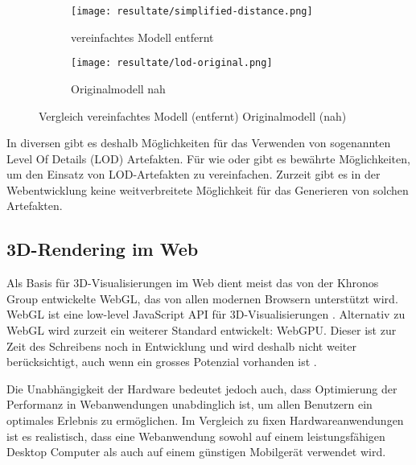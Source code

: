 \begin{figure}[H]
  \centering
  \begin{subfigure}{.4\textwidth}
    \centering
    \texttt{[image: resultate/simplified-distance.png]}
    \caption{vereinfachtes Modell entfernt}
    \label{fig:lodComparisonSimplified}
  \end{subfigure}
  \begin{subfigure}{.4\textwidth}
    \centering
    \texttt{[image: resultate/lod-original.png]}
    \caption{Originalmodell nah}
    \label{fig:lodComparisonOriginal}
  \end{subfigure}
  \caption{Vergleich vereinfachtes Modell (entfernt) Originalmodell (nah)}
\end{figure}

In diversen  gibt es deshalb Möglichkeiten für das Verwenden von sogenannten Level Of Details (LOD) Artefakten.
Für  wie  oder  gibt es bewährte Möglichkeiten, um den Einsatz von LOD-Artefakten zu vereinfachen. Zurzeit gibt es in der Webentwicklung keine weitverbreitete Möglichkeit für das Generieren von solchen Artefakten.

\subsection{3D-Rendering im Web}

Als Basis für 3D-Visualisierungen im Web dient meist das von der Khronos Group entwickelte WebGL, das von allen modernen Browsern unterstützt wird. WebGL ist eine low-level JavaScript API für 3D-Visualisierungen \cite{webGl1Spec}.
Alternativ zu WebGL wird zurzeit ein weiterer Standard entwickelt: WebGPU. Dieser ist zur Zeit des Schreibens noch in Entwicklung und wird deshalb nicht weiter berücksichtigt, auch wenn ein grosses Potenzial vorhanden ist \cite{webGPUCharter}.

Die Unabhängigkeit der Hardware bedeutet jedoch auch, dass Optimierung der Performanz in Webanwendungen unabdinglich ist, um allen Benutzern ein optimales Erlebnis zu ermöglichen.
Im Vergleich zu fixen Hardwareanwendungen ist es realistisch, dass eine Webanwendung sowohl auf einem leistungsfähigen Desktop Computer als auch auf einem günstigen Mobilgerät verwendet wird.

